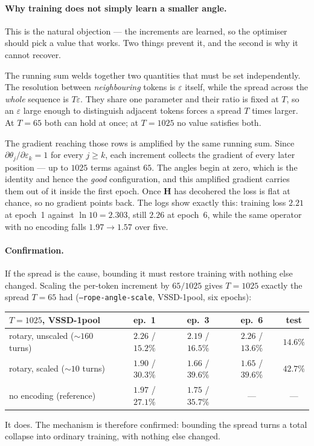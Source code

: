 \documentclass[11pt,a4paper]{article}
\begin{document}
\paragraph{Why training does not simply learn a smaller angle.}
This is the natural objection --- the increments are learned, so the optimiser should
pick a value that works. Two things prevent it, and the second is why it cannot
recover.

The running sum welds together two quantities that must be set independently. The
resolution between \emph{neighbouring} tokens is $\varepsilon$ itself, while the
spread across the \emph{whole} sequence is $T\varepsilon$. They share one parameter
and their ratio is fixed at $T$, so an $\varepsilon$ large enough to distinguish
adjacent tokens forces a spread $T$ times larger. At $T{=}65$ both can hold at once;
at $T{=}1025$ no value satisfies both.

The gradient reaching those rows is amplified by the same running sum. Since
$\partial\theta_j/\partial\varepsilon_k=1$ for every $j\ge k$, each increment collects
the gradient of every later position --- up to $1025$ terms against $65$. The angles
begin at zero, which is the identity and hence the \emph{good} configuration, and this
amplified gradient carries them out of it inside the first epoch. Once $\bm{H}$ has
decohered the loss is flat at chance, so no gradient points back. The logs show
exactly this: training loss $2.21$ at epoch~1 against $\ln 10=2.303$, still $2.26$ at
epoch~6, while the same operator with no encoding falls $1.97\to1.57$ over five.

\paragraph{Confirmation.}
If the spread is the cause, bounding it must restore training with nothing else
changed. Scaling the per-token increment by $65/1025$ gives $T{=}1025$ exactly the
spread $T{=}65$ had (\texttt{--rope-angle-scale}, VSSD-1pool, six epochs):
\begin{center}\small
\begin{tabular}{|l|cc|cc|}
\hline
$T{=}1025$, VSSD-1pool & ep.\ 1 & ep.\ 3 & ep.\ 6 & test \\ \hline
rotary, unscaled ($\sim$$160$ turns) & $2.26$ / $15.2\%$ & $2.19$ / $16.5\%$ & $2.26$ / $13.6\%$ & $14.6\%$ \\ \hline
rotary, scaled ($\sim$$10$ turns) & $1.90$ / $30.3\%$ & $1.66$ / $39.6\%$ & $1.65$ / $39.6\%$ & $42.7\%$ \\ \hline
no encoding (reference) & $1.97$ / $27.1\%$ & $1.75$ / $35.7\%$ & --- & --- \\ \hline
\end{tabular}
\end{center}
It does. The mechanism is therefore confirmed: bounding the spread turns a total
collapse into ordinary training, with nothing else changed.
\end{document}

